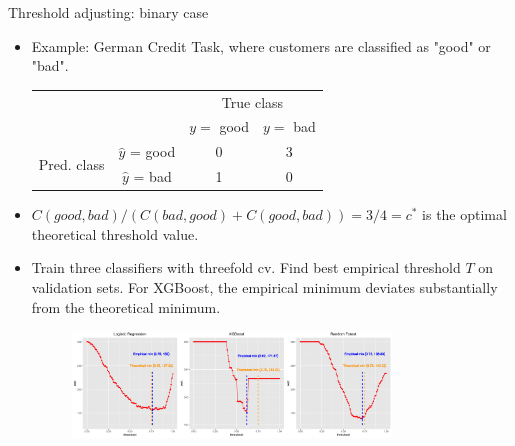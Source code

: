 \documentclass[11pt,compress,t,notes=noshow, xcolor=table]{beamer}
\begin{document}
\begin{vbframe}{Threshold adjusting: binary case}
    \footnotesize 
    \begin{itemize}
        \scriptsize
        \item Example: German Credit Task, where customers are classified as "good" or "bad".
        \begin{center}
                            \begin{tabular}{cc|cc}
        			& &\multicolumn{2}{c}{True class} \\
        			& & $y=$ good & $y=$ bad  \\
        			\hline
        			\multirow{2}{*}{\parbox{0.3cm}{Pred.  class}} & $\hat y$ = good & 0 & 3 \\
        			& $\hat y$ = bad & 1 & 0\\
                \end{tabular}
        \end{center}
        \item $C(good,bad)/(C(bad,good)+C(good,bad))=3/4=c^{*}$ is the optimal theoretical threshold value.

        \item Train three classifiers with threefold cv. Find best empirical threshold $T$ on validation sets. For XGBoost, the empirical minimum deviates substantially from the theoretical minimum.

                \begin{figure}[h]
            \centering
            \includegraphics[width=0.8\textwidth]{slides/imbalanced-learning/figure_man/Cost_Curves_plot.png}
        \end{figure}

    \end{itemize}
\end{vbframe}
\end{document}
